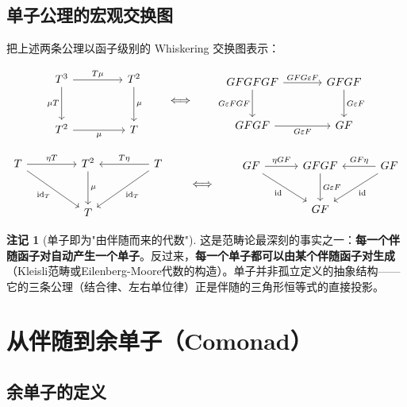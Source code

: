 \documentclass[12pt,a4paper]{ctexart}
\theoremstyle{definition}
\newtheorem{remark}[definition]{注记}
\newcommand{\id}{\mathrm{id}}
\begin{document}
\subsection{单子公理的宏观交换图}

把上述两条公理以函子级别的 Whiskering 交换图表示：

\[
\begin{tikzcd}[column sep=4.5em, row sep=3em]
T^3 \arrow[r,"T\mu"] \arrow[d,"\mu T"'] & T^2 \arrow[d,"\mu"] \\
T^2 \arrow[r,"\mu"'] & T
\end{tikzcd}
\qquad\Longleftrightarrow\qquad
\begin{tikzcd}[column sep=3.5em, row sep=2.5em]
GFGFGF \arrow[r,"GFG\varepsilon F"] \arrow[d,"G\varepsilon FGF"'] & GFGF \arrow[d,"G\varepsilon F"] \\
GFGF \arrow[r,"G\varepsilon F"'] & GF
\end{tikzcd}
\]

\[
\begin{tikzcd}[column sep=4.5em, row sep=3em]
T \arrow[r,"\eta T"] \arrow[dr,"\id_T"'] & T^2 \arrow[d,"\mu"] & T \arrow[l,"T\eta"'] \arrow[dl,"\id_T"] \\
& T &
\end{tikzcd}
\qquad\Longleftrightarrow\qquad
\begin{tikzcd}[column sep=3em, row sep=2.5em]
GF \arrow[r,"\eta GF"] \arrow[dr,"\id"'] & GFGF \arrow[d,"G\varepsilon F"] & GF \arrow[l,"GF\eta"'] \arrow[dl,"\id"] \\
& GF &
\end{tikzcd}
\]

\begin{remark}[单子即为"由伴随而来的代数"]\label{rmk:monad-origin}
这是范畴论最深刻的事实之一：\textbf{每一个伴随函子对自动产生一个单子}。反过来，\textbf{每一个单子都可以由某个伴随函子对生成}（Kleisli范畴或Eilenberg-Moore代数的构造）。单子并非孤立定义的抽象结构——它的三条公理（结合律、左右单位律）正是伴随的三角形恒等式的直接投影。
\end{remark}

\newpage

\section{从伴随到余单子（Comonad）}

\subsection{余单子的定义}
\end{document}
